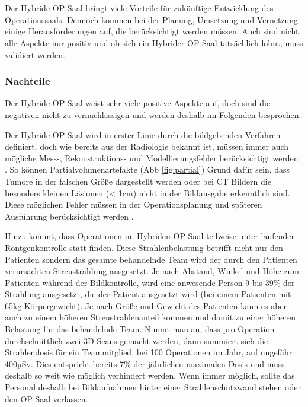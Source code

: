 \chapter{}
\label{sec:overview}

Der Hybride OP-Saal bringt viele Vorteile für zukünftige Entwicklung des Operationssaals. Dennoch kommen bei der Planung, Umsetzung und Vernetzung einige Herausforderungen auf, die berücksichtigt werden müssen. 
Auch sind nicht alle Aspekte nur positiv und ob sich ein Hybrider OP-Saal tatsächlich lohnt, muss validiert werden.

\subsection{Nachteile}

Der Hybride OP-Saal weist sehr viele positive Aspekte auf, doch sind die negativen nicht zu vernachlässigen und werden deshalb im Folgenden besprochen.

Der Hybride OP-Saal wird in erster Linie durch die bildgebenden Verfahren definiert, doch wie bereits aus der Radiologie bekannt ist, müssen immer auch mögliche \glqq Mess-, Rekonstruktions- und Modellierungsfehler berücksichtigt werden\grqq{} \cite{DerDigitaleOperationssaal}. 
So können Partialvolumenartefakte (Abb \ref{fig:partial}) Grund dafür sein, dass Tumore in der falschen Größe dargestellt werden oder bei CT Bildern die besonders kleinen Läsionen (< 1cm) nicht in der Bildausgabe erkenntlich sind. Diese möglichen Fehler müssen in der Operationsplanung und späteren Ausführung berücksichtigt werden \cite{DerDigitaleOperationssaal}.

Hinzu kommt, dass Operationen im Hybriden OP-Saal teilweise unter laufender Röntgenkontrolle statt finden. Diese Strahlenbelastung betrifft nicht nur den Patienten sondern das gesamte behandelnde Team wird der durch den Patienten verursachten Streustrahlung ausgesetzt. Je nach Abstand, Winkel und Höhe zum Patienten während der Bildkontrolle, wird eine anwesende Person 9 bis 39\% der Strahlung ausgesetzt, die der Patient ausgesetzt wird (bei einem Patienten mit 65kg Körpergewicht). Je nach Größe und Gewicht des Patienten kann es aber auch zu einem höheren Streustrahlenanteil kommen und damit zu einer höheren Belastung für das behandelnde Team.
Nimmt man an, dass pro Operation durchschnittlich zwei 3D Scans gemacht werden, dann summiert sich die Strahlendosis für ein Teammitglied, bei 100 Operationen im Jahr, auf ungefähr 400µSv. Dies entspricht bereits 7\% der jährlichen maximalen Dosis und muss deshalb so weit wie möglich verhindert werden. Wenn immer möglich, sollte das Personal deshalb bei Bildaufnahmen hinter einer Strahlenschutzwand stehen oder den OP-Saal verlassen\cite{RadiationExposure}.

